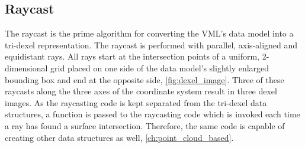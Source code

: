 \subsection{Raycast}
\label{sec:tri_dexel_raycast}

The raycast is the prime algorithm for converting the VML's data model into a tri-dexel representation.
The raycast is performed with parallel, axis-aligned and equidistant rays.
All rays start at the intersection points of a uniform, 2-dimensional grid placed on one side of the data model's slightly enlarged bounding box and end at the opposite side, \cf \cref{fig:dexel_image}.
Three of these raycasts along the three axes of the coordinate system result in three dexel images.
As the raycasting code is kept separated from the tri-dexel data structures, a function is passed to the raycasting code which is invoked each time a ray has found a surface intersection.
Therefore, the same code is capable of creating other data structures as well, \cf \cref{ch:point_cloud_based}.

